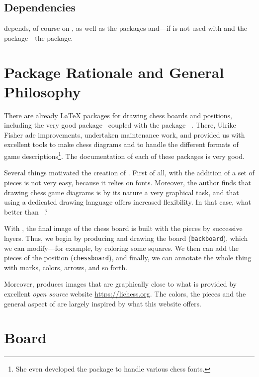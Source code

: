 \documentclass[english]{ltxdoc}
\begin{document}
\subsection{Dependencies}


\mpchess depends, of course on \MP, as well as the packages 
and---if \mpchess is not used with  and the 
package---the  package.


\section{Package Rationale and General Philosophy}

There are already \LaTeX{} packages for drawing chess boards and positions,
including the very good package ~\cite{ctan-xskak}coupled with
the package ~\cite{ctan-chessboard}. 
There, Ulrike Fisher ade improvements, undertaken maintenance work, and provided us with excellent tools to make chess diagrams and to handle the different
formats of
game descriptions\footnote{She even developed the
package to handle various chess fonts.}. The
documentation of each of these packages is very good.

Several things motivated the creation of \mpchess. First of all, with
 the addition of a set of pieces is not very easy, because
it relies on fonts. Moreover, the author finds that drawing chess game diagrams is by its nature a very graphical task, and that using a dedicated drawing
language offers increased flexibility. In that case, what better than \MP~\cite{ctan-metapost}?

With \mpchess, the final image of the chess board is built with the pieces
by successive layers. Thus, we begin by producing and drawing the board
(\lstinline+backboard+), which we can modify---for example, by
coloring some squares. We then can add the pieces of the position (\lstinline+chessboard+),
and finally, we can annotate the whole thing with marks, colors,
arrows, and so forth. 


Moreover, \mpchess produces images that are graphically close to what is
provided by excellent  \emph{open source} website \url{https://lichess.org}. The colors, the pieces and the general aspect of
\mpchess are largely inspired
by what this website offers.

\section{Board}
\end{document}

